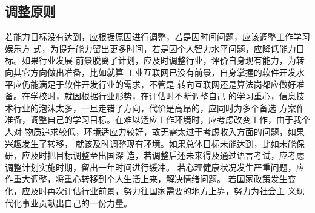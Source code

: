 \documentclass{article}
\begin{document}
\subsection{调整原则}
若能力目标没有达到，应根据原因进行调整，若是因时间问题，应该调整工作学习娱乐方
式，为提升能力留出更多时间，若是因个人智力水平问题，应降低能力目标。如果行业发展
前景脱离了计划，应及时调整行业，评价自身现有能力，为转向其它方向做出准备，比如就算
工业互联网已没有前景，自身掌握的软件开发水平应仍能满足于软件开发行业的需求，不管是
转向互联网还是算法岗都应做好准备。在学校时，就因根据行业形势，在评估时不断调整自己
的学习重心，信息技术行业的泡沫太多，一旦走错了方向，代价是高昂的，应同时为多个备选
方案作准备，调整自己的学习目标。在难以适应工作环境时，应考虑改变工作，由于我个人对
物质追求较低，环境适应力较好，故无需太过于考虑收入方面的问题，如果兴趣发生了转移，
就该及时调整现有环境。如果总体目标未能达到，比如未能保研，应及时把目标调整至出国深
造，若调整后还未来得及通过语言考试，应考虑调整计划实施时期，留出一年时间进行缓冲。
若心理健康状况发生严重问题，应作重大调整，将重心转移到个人生活上来，解决情绪问题。
若国家政策发生变化，应及时再次评估行业前景，努力往国家需要的地方上靠，努力为社会主
义现代化事业贡献出自己的一份力量。
\end{document}
